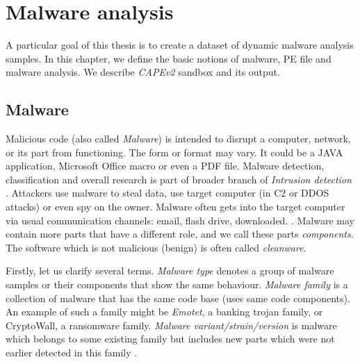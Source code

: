 \chapter{Malware analysis} \label{chap:analysis}
A particular goal of this thesis is to create a dataset of dynamic malware analysis samples. In this chapter, we define the basic notions of malware, PE file and malware analysis. We describe \emph{CAPEv2} sandbox and its output. 

\section{Malware}
Malicious code (also called \emph{Malware}) is intended to disrupt a computer, network, or its part from functioning. The form or format may vary. It could be a JAVA application, Microsoft Office macro or even a PDF file. Malware detection, classification and overall research is part of broader branch of \emph{Intrusion detection} \cite{Cole2009}. Attackers use malware to steal data, use target computer (in C2 or DDOS attacks) or even spy on the owner. Malware often gets into the target computer via usual communication channels: email, flash drive, downloaded. \cite{KA2018}. Malware may contain more parts that have a different role, and we call these parts \emph{components}. The software which is not malicious (benign) is often called \emph{cleanware}.

Firstly, let us clarify several terms. \emph{Malware type} denotes a group of malware samples or their components that show the same behaviour. \emph{Malware family} is a collection of malware that has the same code base (uses same code components). An example of such a family might be \emph{Emotet}, a banking trojan family, or CryptoWall, a ransomware family. \emph{Malware variant/strain/version} is malware which belongs to some existing family but includes new parts which were not earlier detected in this family \cite{Cohen2019}.


